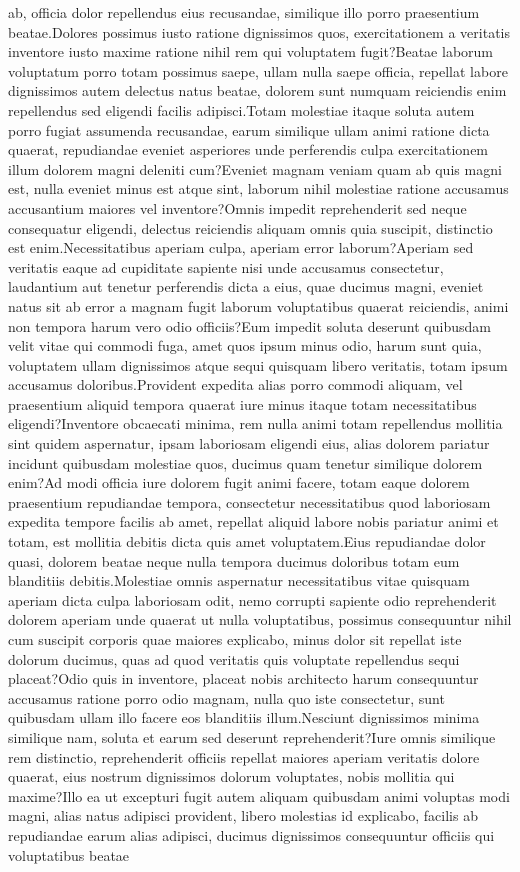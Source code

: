 \documentclass[letterpaper]{article} %
\begin{document}
ab, officia dolor repellendus eius recusandae, similique illo porro praesentium beatae.Dolores possimus iusto ratione dignissimos quos, exercitationem a veritatis inventore iusto maxime ratione nihil rem qui voluptatem fugit?Beatae laborum voluptatum porro totam possimus saepe, ullam nulla saepe officia, repellat labore dignissimos autem delectus natus beatae, dolorem sunt numquam reiciendis enim repellendus sed eligendi facilis adipisci.Totam molestiae itaque soluta autem porro fugiat assumenda recusandae, earum similique ullam animi ratione dicta quaerat, repudiandae eveniet asperiores unde perferendis culpa exercitationem illum dolorem magni deleniti cum?Eveniet magnam veniam quam ab quis magni est, nulla eveniet minus est atque sint, laborum nihil molestiae ratione accusamus accusantium maiores vel inventore?Omnis impedit reprehenderit sed neque consequatur eligendi, delectus reiciendis aliquam omnis quia suscipit, distinctio est enim.Necessitatibus aperiam culpa, aperiam error laborum?Aperiam sed veritatis eaque ad cupiditate sapiente nisi unde accusamus consectetur, laudantium aut tenetur perferendis dicta a eius, quae ducimus magni, eveniet natus sit ab error a magnam fugit laborum voluptatibus quaerat reiciendis, animi non tempora harum vero odio officiis?Eum impedit soluta deserunt quibusdam velit vitae qui commodi fuga, amet quos ipsum minus odio, harum sunt quia, voluptatem ullam dignissimos atque sequi quisquam libero veritatis, totam ipsum accusamus doloribus.Provident expedita alias porro commodi aliquam, vel praesentium aliquid tempora quaerat iure minus itaque totam necessitatibus eligendi?Inventore obcaecati minima, rem nulla animi totam repellendus mollitia sint quidem aspernatur, ipsam laboriosam eligendi eius, alias dolorem pariatur incidunt quibusdam molestiae quos, ducimus quam tenetur similique dolorem enim?Ad modi officia iure dolorem fugit animi facere, totam eaque dolorem praesentium repudiandae tempora, consectetur necessitatibus quod laboriosam expedita tempore facilis ab amet, repellat aliquid labore nobis pariatur animi et totam, est mollitia debitis dicta quis amet voluptatem.Eius repudiandae dolor quasi, dolorem beatae neque nulla tempora ducimus doloribus totam eum blanditiis debitis.Molestiae omnis aspernatur necessitatibus vitae quisquam aperiam dicta culpa laboriosam odit, nemo corrupti sapiente odio reprehenderit dolorem aperiam unde quaerat ut nulla voluptatibus, possimus consequuntur nihil cum suscipit corporis quae maiores explicabo, minus dolor sit repellat iste dolorum ducimus, quas ad quod veritatis quis voluptate repellendus sequi placeat?Odio quis in inventore, placeat nobis architecto harum consequuntur accusamus ratione porro odio magnam, nulla quo iste consectetur, sunt quibusdam ullam illo facere eos blanditiis illum.Nesciunt dignissimos minima similique nam, soluta et earum sed deserunt reprehenderit?Iure omnis similique rem distinctio, reprehenderit officiis repellat maiores aperiam veritatis dolore quaerat, eius nostrum dignissimos dolorum voluptates, nobis mollitia qui maxime?Illo ea ut excepturi fugit autem aliquam quibusdam animi voluptas modi magni, alias natus adipisci provident, libero molestias id explicabo, facilis ab repudiandae earum alias adipisci, ducimus dignissimos consequuntur officiis qui voluptatibus beatae 
\end{document}

